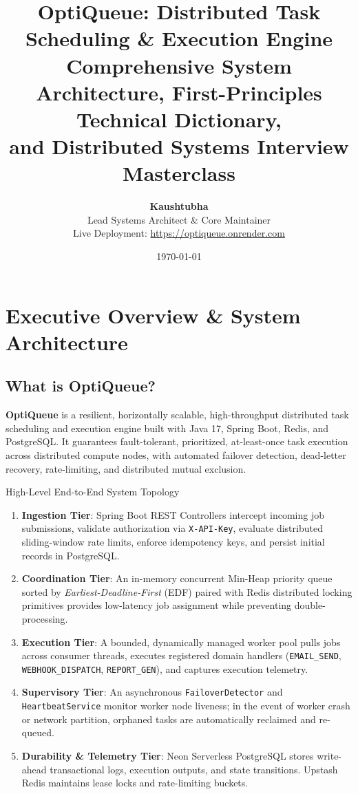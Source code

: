 \documentclass[11pt,a4paper]{article}
\title{
    \vspace{-1.5cm}
    \textbf{\huge OptiQueue: Distributed Task Scheduling \& Execution Engine}\\[0.3cm]
    \large Comprehensive System Architecture, First-Principles Technical Dictionary,\\
    and Distributed Systems Interview Masterclass
}
\author{\textbf{Kaushtubha} \\ \small Lead Systems Architect \& Core Maintainer \\ \small Live Deployment: \url{https://optiqueue.onrender.com}}
\date{\today}
\begin{document}
\maketitle
\tableofcontents
\newpage

\section{Executive Overview \& System Architecture}

\subsection{What is OptiQueue?}
\textbf{OptiQueue} is a resilient, horizontally scalable, high-throughput distributed task scheduling and execution engine built with Java 17, Spring Boot, Redis, and PostgreSQL. It guarantees fault-tolerant, prioritized, at-least-once task execution across distributed compute nodes, with automated failover detection, dead-letter recovery, rate-limiting, and distributed mutual exclusion.

\begin{architecturebox}{High-Level End-to-End System Topology}
\begin{enumerate}
    \item \textbf{Ingestion Tier}: Spring Boot REST Controllers intercept incoming job submissions, validate authorization via \texttt{X-API-Key}, evaluate distributed sliding-window rate limits, enforce idempotency keys, and persist initial records in PostgreSQL.
    \item \textbf{Coordination Tier}: An in-memory concurrent Min-Heap priority queue sorted by \textit{Earliest-Deadline-First} (EDF) paired with Redis distributed locking primitives provides low-latency job assignment while preventing double-processing.
    \item \textbf{Execution Tier}: A bounded, dynamically managed worker pool pulls jobs across consumer threads, executes registered domain handlers (\texttt{EMAIL\_SEND}, \texttt{WEBHOOK\_DISPATCH}, \texttt{REPORT\_GEN}), and captures execution telemetry.
    \item \textbf{Supervisory Tier}: An asynchronous \texttt{FailoverDetector} and \texttt{HeartbeatService} monitor worker node liveness; in the event of worker crash or network partition, orphaned tasks are automatically reclaimed and re-queued.
    \item \textbf{Durability \& Telemetry Tier}: Neon Serverless PostgreSQL stores write-ahead transactional logs, execution outputs, and state transitions. Upstash Redis maintains lease locks and rate-limiting buckets.
\end{enumerate}
\end{architecturebox}
\end{document}
